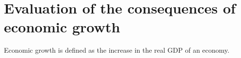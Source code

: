 \documentclass[a4paper,12pt]{article}
\begin{document}
\section{Evaluation of the consequences of economic growth}


Economic growth is defined as the increase in the real GDP of an economy. %
\end{document}
